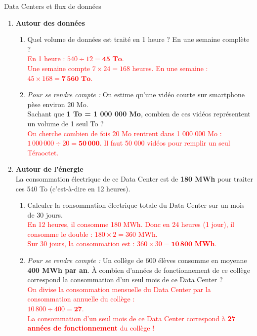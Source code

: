 \documentclass[a4paper]{book}
\begin{document}
{\begin{exerciceTitre}{Data Centers et flux de données}
        \begin{enumerate}
            \item \textbf{Autour des données}
            \begin{enumerate}
                \item Quel volume de données est traité en 1 heure ? En une semaine complète ? \\
                \textcolor{red}{En 1 heure : $540 \div 12 = \mathbf{45 \text{ To}}$. \\
                Une semaine compte $7 \times 24 = 168$ heures. En une semaine : $45 \times 168 = \mathbf{7\,560 \text{ To}}$.}
                
                \item \textit{Pour se rendre compte :} On estime qu'une vidéo courte sur smartphone pèse environ 20 Mo. \\
                Sachant que \textbf{1 To = 1 000 000 Mo}, combien de ces vidéos représentent un volume de 1 seul To ? \\
                \textcolor{red}{On cherche combien de fois 20 Mo rentrent dans 1 000 000 Mo : \\ $1\,000\,000 \div 20 = \mathbf{50\,000}$. Il faut 50 000 vidéos pour remplir un seul Téraoctet.}
            \end{enumerate}


\newpage
            
            \item \textbf{Autour de l'énergie} \\
            La consommation électrique de ce Data Center est de \textbf{180 MWh} pour traiter ces 540 To (c'est-à-dire en 12 heures).
            \begin{enumerate}
                \item Calculer la consommation électrique totale du Data Center sur un mois de 30 jours. \\
                \textcolor{red}{En 12 heures, il consomme 180 MWh. Donc en 24 heures (1 jour), il consomme le double : $180 \times 2 = 360$ MWh. \\
                Sur 30 jours, la consommation est : $360 \times 30 = \mathbf{10\,800 \text{ MWh}}$.}
                
                \item \textit{Pour se rendre compte :} Un collège de 600 élèves consomme en moyenne \textbf{400 MWh par an}. À combien d'années de fonctionnement de ce collège correspond la consommation d'un seul mois de ce Data Center ? \\
                \textcolor{red}{On divise la consommation mensuelle du Data Center par la consommation annuelle du collège : \\
                $10\,800 \div 400 = \mathbf{27}$. \\
                La consommation d'un seul mois de ce Data Center correspond à \textbf{27 années de fonctionnement} du collège !}
            \end{enumerate}
        \end{enumerate}
    \end{exerciceTitre}



}
\end{document}
